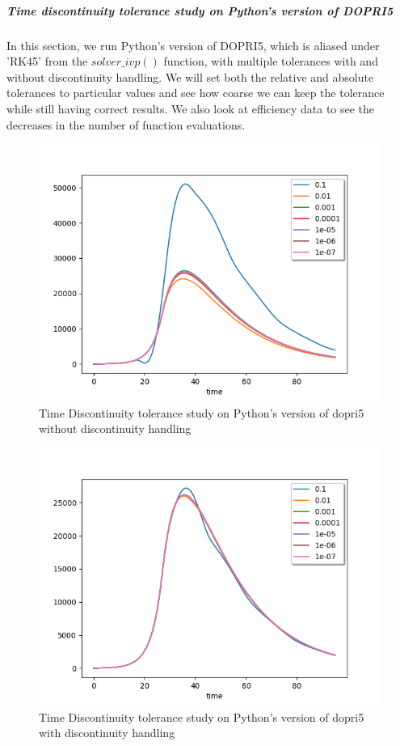 \subparagraph{Time discontinuity tolerance study on Python's version of DOPRI5}
In this section, we run Python's version of DOPRI5, which is aliased under 'RK45' from the $solver\_ivp()$ function, with multiple tolerances with and without discontinuity handling. We will set both the relative and absolute tolerances to particular values and see how coarse we can keep the tolerance while still having correct results. We also look at efficiency data to see the decreases in the number of function evaluations.

\begin{figure}[h]
	\centering
	\includegraphics[width=0.7\linewidth]{./figures/tolerance_time_rk45_no_event_py}
	\caption{Time Discontinuity tolerance study on Python's version of dopri5 without discontinuity handling}
	\label{fig:tolerance_time_rk45_no_event_py}
\end{figure}

\begin{figure}[h]
	\centering
	\includegraphics[width=0.7\linewidth]{./figures/tolerance_time_rk45_with_event_py}
	\caption{Time Discontinuity tolerance study on Python's version of dopri5 with discontinuity handling}
	\label{fig:tolerance_time_rk45_with_event_py}
\end{figure}

